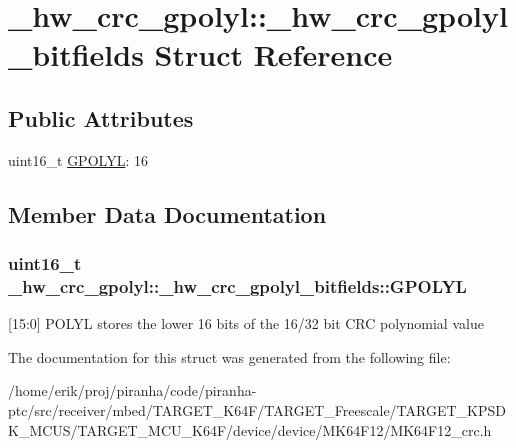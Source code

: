 \hypertarget{struct__hw__crc__gpolyl_1_1__hw__crc__gpolyl__bitfields}{}\section{\+\_\+hw\+\_\+crc\+\_\+gpolyl\+:\+:\+\_\+hw\+\_\+crc\+\_\+gpolyl\+\_\+bitfields Struct Reference}
\label{struct__hw__crc__gpolyl_1_1__hw__crc__gpolyl__bitfields}
\subsection*{Public Attributes}
\begin{DoxyCompactItemize}
\item 
uint16\+\_\+t \hyperlink{struct__hw__crc__gpolyl_1_1__hw__crc__gpolyl__bitfields_acb3be39c877e05701d92c993ffa6c313}{G\+P\+O\+L\+YL}\+: 16
\end{DoxyCompactItemize}


\subsection{Member Data Documentation}
\subsubsection[{\texorpdfstring{G\+P\+O\+L\+YL}{GPOLYL}}]{\setlength{\rightskip}{0pt plus 5cm}uint16\+\_\+t \+\_\+hw\+\_\+crc\+\_\+gpolyl\+::\+\_\+hw\+\_\+crc\+\_\+gpolyl\+\_\+bitfields\+::\+G\+P\+O\+L\+YL}\hypertarget{struct__hw__crc__gpolyl_1_1__hw__crc__gpolyl__bitfields_acb3be39c877e05701d92c993ffa6c313}{}\label{struct__hw__crc__gpolyl_1_1__hw__crc__gpolyl__bitfields_acb3be39c877e05701d92c993ffa6c313}
\mbox{[}15\+:0\mbox{]} P\+O\+L\+YL stores the lower 16 bits of the 16/32 bit C\+RC polynomial value 

The documentation for this struct was generated from the following file\+:\begin{DoxyCompactItemize}
\item 
/home/erik/proj/piranha/code/piranha-\/ptc/src/receiver/mbed/\+T\+A\+R\+G\+E\+T\+\_\+\+K64\+F/\+T\+A\+R\+G\+E\+T\+\_\+\+Freescale/\+T\+A\+R\+G\+E\+T\+\_\+\+K\+P\+S\+D\+K\+\_\+\+M\+C\+U\+S/\+T\+A\+R\+G\+E\+T\+\_\+\+M\+C\+U\+\_\+\+K64\+F/device/device/\+M\+K64\+F12/M\+K64\+F12\+\_\+crc.\+h\end{DoxyCompactItemize}
